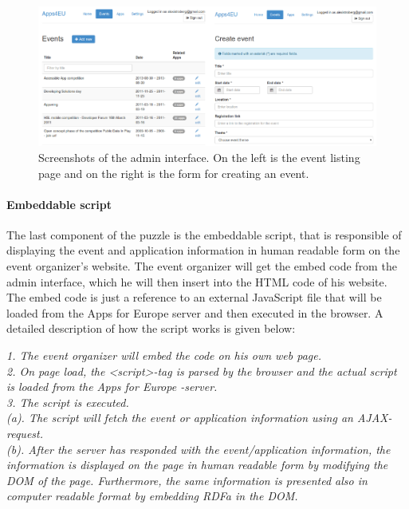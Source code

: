 \begin{figure}[ht!]
\includegraphics[scale=0.95]{img/adminInterface.pdf}
\caption{Screenshots of the admin interface. On the left is the event listing
 page and on the right is the form for creating an event.}
 \label{fig:adminInterface}
\end{figure}


\paragraph{Embeddable script}
The last component of the puzzle is the embeddable script, that is responsible of displaying the event and application information in human readable form on the event organizer's website. The event organizer will get the embed code from the admin interface, which he will then insert into the HTML code of his website. The embed code is just a reference to an external JavaScript file that will be loaded from the Apps for Europe server and then executed in the browser. A detailed description of how the script works is given below:
\begin{algorithm}
\textsl{
1. The event organizer will embed the code on his own web page.\\
2. On page load, the <script>-tag is parsed by the browser and the actual script is loaded from the Apps for Europe -server.\\
3.	The script is executed.\\
(a).	The script will fetch the event or application information using an AJAX-request.\\
(b).	After the server has responded with the event/application information, the information is displayed on the page in human readable form by modifying the DOM of the page. Furthermore, the same information is presented also in computer readable format by embedding RDFa in the DOM.
}

\end{algorithm}


